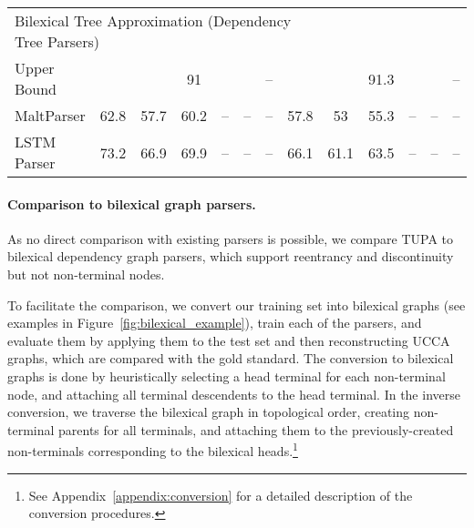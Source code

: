 \documentclass[11pt,a4paper]{article}
\newcommand{\parser}[1]{TUPA\textsubscript{#1}}
\newcommand{\figref}[1]{Figure~\ref{#1}}
\begin{document}
\begin{table*}
\begin{tabular}{l|ccc|ccc||ccc|ccc}
		\hline
		\multicolumn{8}{l}{\rule{0pt}{2ex} \footnotesize
		Bilexical Tree Approximation (Dependency Tree Parsers)} \\
		\small Upper Bound
		& & & \small 91 & & & \small --
		& & & \small 91.3 & & & \small -- \\
		MaltParser
		& 62.8 & 57.7 & 60.2 & -- & -- & --
		& 57.8 & 53 & 55.3 & -- & -- & -- \\
		LSTM Parser
		& 73.2 & 66.9 & 69.9 & -- & -- & --
		& 66.1 & 61.1 & 63.5 & -- & -- & --
	\end{tabular}
	\caption{
	  Experimental results, in percents, on the \textit{Wiki} test set (left)
	  and the \textit{20K Leagues} set (right).
	  Columns correspond to labeled precision, recall and F-score,
	  for both primary and remote edges.
	  F-score upper bounds are reported for the conversions.
	  For the tree approximation experiments, only primary edges scores are reported,
	  as they are unable to predict remote edges.
	  \parser{BiLSTM} obtains the highest F-scores in all metrics, surpassing the
	  bilexical parsers, tree parsers and other classifiers.
	}
	\label{table:results}
\end{table*}

\paragraph{Comparison to bilexical graph parsers.}
As no direct comparison with existing parsers is possible,
we compare \parser{} to bilexical dependency graph parsers,
which support reentrancy and discontinuity but not non-terminal nodes.

To facilitate the comparison, we convert our training set into bilexical graphs
(see examples in \figref{fig:bilexical_example}),
train each of the parsers, and evaluate them by applying them to the test set
and then reconstructing UCCA graphs, which are compared with the gold standard.
The conversion to bilexical graphs is done by heuristically selecting a head terminal for each
non-terminal node, and attaching all terminal descendents to the head terminal.
In the inverse conversion, we traverse the bilexical graph in topological order,
creating non-terminal parents for all terminals, and attaching them to the previously-created
non-terminals corresponding to the bilexical
heads.\footnote{See Appendix~\ref{appendix:conversion} for a detailed description of
the conversion procedures.}
\end{document}
